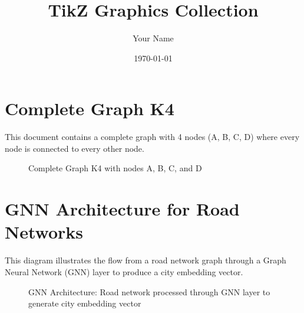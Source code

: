 \documentclass[11pt,a4paper]{article}
\title{TikZ Graphics Collection}
\author{Your Name}
\date{\today}
\begin{document}
\maketitle

\section{Complete Graph K4}

This document contains a complete graph with 4 nodes (A, B, C, D) where every node is connected to every other node.

\begin{figure}[h]
    \centering
    \resizebox{\textwidth}{!}{}
    \caption{Complete Graph K4 with nodes A, B, C, and D}
    \label{fig:complete-graph-k4}
\end{figure}

\section{GNN Architecture for Road Networks}

This diagram illustrates the flow from a road network graph through a Graph Neural Network (GNN) layer to produce a city embedding vector.

\begin{figure}[h]
    \centering
    
    \caption{GNN Architecture: Road network processed through GNN layer to generate city embedding vector}
    \label{fig:gnn-road-network}
\end{figure}
\end{document}
